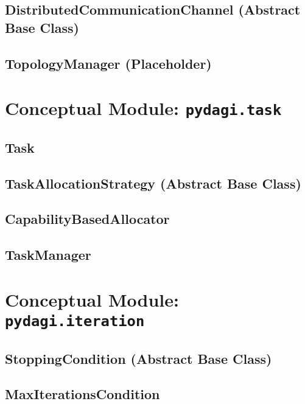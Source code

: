 \documentclass{amsbook}
\theoremstyle{definition}
\theoremstyle{remark}
\numberwithin{equation}{chapter} %
\begin{document}
        \subsection{DistributedCommunicationChannel (Abstract Base Class)}
        \subsection{TopologyManager (Placeholder)}
    \section{Conceptual Module: \texttt{pydagi.task}}
        \subsection{Task}
        \subsection{TaskAllocationStrategy (Abstract Base Class)}
        \subsection{CapabilityBasedAllocator}
        \subsection{TaskManager}
    \section{Conceptual Module: \texttt{pydagi.iteration}}
        \subsection{StoppingCondition (Abstract Base Class)}
        \subsection{MaxIterationsCondition}
\end{document}
